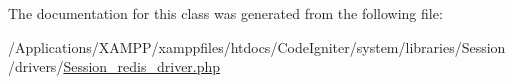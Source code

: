 The documentation for this class was generated from the following file\+:\begin{DoxyCompactItemize}
\item 
/\+Applications/\+X\+A\+M\+P\+P/xamppfiles/htdocs/\+Code\+Igniter/system/libraries/\+Session/drivers/\mbox{\hyperlink{_session__redis__driver_8php}{Session\+\_\+redis\+\_\+driver.\+php}}\end{DoxyCompactItemize}
